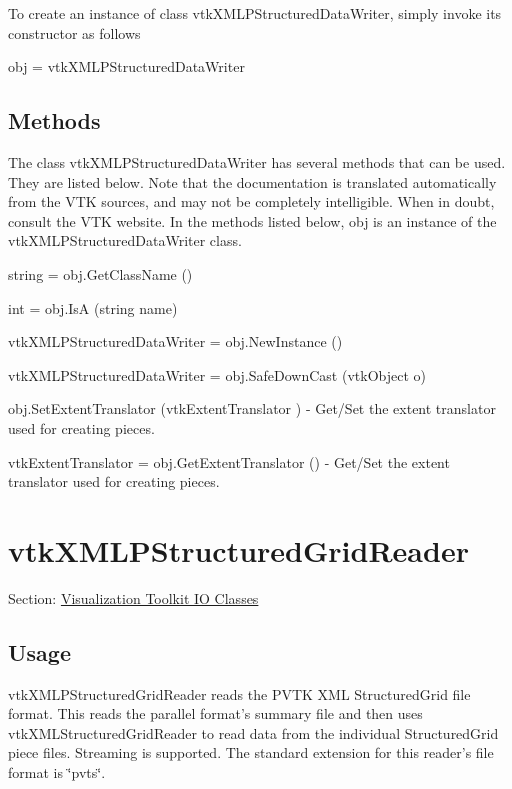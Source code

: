 To create an instance of class vtk\-X\-M\-L\-P\-Structured\-Data\-Writer, simply invoke its constructor as follows \begin{DoxyVerb}  obj = vtkXMLPStructuredDataWriter
\end{DoxyVerb}
 \hypertarget{vtkwidgets_vtkxyplotwidget_Methods}{}\subsection{Methods}\label{vtkwidgets_vtkxyplotwidget_Methods}
The class vtk\-X\-M\-L\-P\-Structured\-Data\-Writer has several methods that can be used. They are listed below. Note that the documentation is translated automatically from the V\-T\-K sources, and may not be completely intelligible. When in doubt, consult the V\-T\-K website. In the methods listed below, {\ttfamily obj} is an instance of the vtk\-X\-M\-L\-P\-Structured\-Data\-Writer class. 
\begin{DoxyItemize}
\item {\ttfamily string = obj.\-Get\-Class\-Name ()}  
\item {\ttfamily int = obj.\-Is\-A (string name)}  
\item {\ttfamily vtk\-X\-M\-L\-P\-Structured\-Data\-Writer = obj.\-New\-Instance ()}  
\item {\ttfamily vtk\-X\-M\-L\-P\-Structured\-Data\-Writer = obj.\-Safe\-Down\-Cast (vtk\-Object o)}  
\item {\ttfamily obj.\-Set\-Extent\-Translator (vtk\-Extent\-Translator )} -\/ Get/\-Set the extent translator used for creating pieces.  
\item {\ttfamily vtk\-Extent\-Translator = obj.\-Get\-Extent\-Translator ()} -\/ Get/\-Set the extent translator used for creating pieces.  
\end{DoxyItemize}\hypertarget{vtkio_vtkxmlpstructuredgridreader}{}\section{vtk\-X\-M\-L\-P\-Structured\-Grid\-Reader}\label{vtkio_vtkxmlpstructuredgridreader}
Section\-: \hyperlink{sec_vtkio}{Visualization Toolkit I\-O Classes} \hypertarget{vtkwidgets_vtkxyplotwidget_Usage}{}\subsection{Usage}\label{vtkwidgets_vtkxyplotwidget_Usage}
vtk\-X\-M\-L\-P\-Structured\-Grid\-Reader reads the P\-V\-T\-K X\-M\-L Structured\-Grid file format. This reads the parallel format's summary file and then uses vtk\-X\-M\-L\-Structured\-Grid\-Reader to read data from the individual Structured\-Grid piece files. Streaming is supported. The standard extension for this reader's file format is \char`\"{}pvts\char`\"{}.

